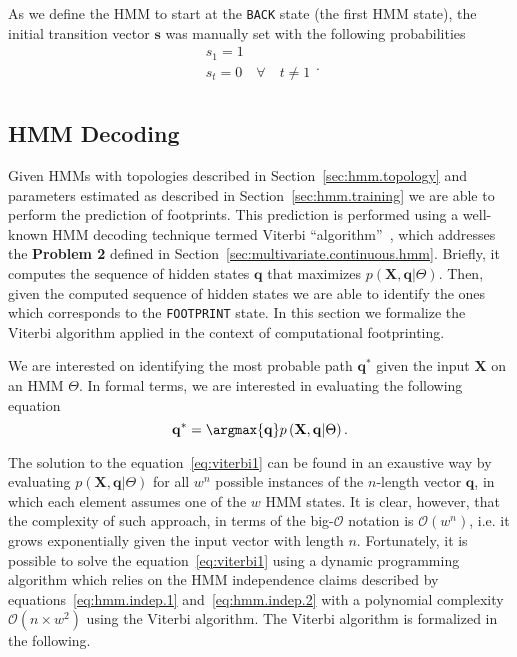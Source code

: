 As we define the HMM to start at the {\tt BACK} state (the first HMM state), the initial transition vector $\mathbf{s}$ was manually set with the following probabilities
\begin{equation}
  \label{eq:hmm.train.s}
  \begin{array}{lcl}
    s_1 = 1 \\
    s_t = 0 \quad \forall \quad t \neq 1 \\
  \end{array}.
\end{equation}

\subsection{HMM Decoding}
\label{sec:hmm.decoding}

Given HMMs with topologies described in Section~\ref{sec:hmm.topology} and parameters estimated as described in Section~\ref{sec:hmm.training} we are able to perform the prediction of footprints. This prediction is performed using a well-known HMM decoding technique termed Viterbi ``algorithm''~\cite{rabiner1989}, which addresses the {\bf Problem 2} defined in Section~\ref{sec:multivariate.continuous.hmm}. Briefly, it computes the sequence of hidden states $ \mathbf{q} $ that maximizes $ p\left( \mathbf{X}, \mathbf{q} | \Theta \right) $. Then, given the computed sequence of hidden states we are able to identify the ones which corresponds to the {\tt FOOTPRINT} state. In this section we formalize the Viterbi algorithm applied in the context of computational footprinting.

We are interested on identifying the most probable path $ \mathbf{q^*} $ given the input $ \mathbf{X} $ on an HMM $ \Theta $. In formal terms, we are interested in evaluating the following equation
\begin{equation}
  \label{eq:viterbi1}
  \mathbf{q^*} = \argmax{\mathbf{q}} p\left(\mathbf{X}, \mathbf{q} | \Theta \right).
\end{equation}

The solution to the equation~\ref{eq:viterbi1} can be found in an exaustive way by evaluating $ p\left(\mathbf{X}, \mathbf{q} | \Theta \right) $ for all $ {w}^{n} $ possible instances of the $n$-length vector $ \mathbf{q} $, in which each element assumes one of the $w$ HMM states. It is clear, however, that the complexity of such approach, in terms of the big-$\mathcal{O}$ notation is $ \mathcal{O}({w}^{n}) $, i.e. it grows exponentially given the input vector with length $n$. Fortunately, it is possible to solve the equation~\ref{eq:viterbi1} using a dynamic programming algorithm which relies on the HMM independence claims described by equations~\ref{eq:hmm.indep.1} and~\ref{eq:hmm.indep.2} with a polynomial complexity $ \mathcal{O}(n \times {w}^2) $ using the Viterbi algorithm. The Viterbi algorithm is formalized in the following.


